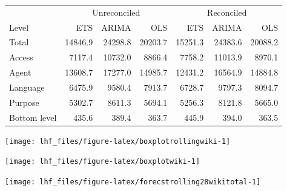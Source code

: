 \documentclass[11pt,a4paper,]{article}
\let\origfigure\figure
\let\endorigfigure\endfigure
\renewenvironment{figure}[1][2] {
    \expandafter\origfigure\expandafter[!htbp]
} {
    \endorigfigure
}
\let\origtable\table
\let\endorigtable\endtable
\renewenvironment{table}[1][2] {
    \expandafter\origtable\expandafter[!htbp]
} {
    \endorigtable
}
\providecommand{\DIFdeltex}[1]{{\protect\color{red}\sout{#1}}}                      %
\providecommand{\DIFdelFL}[1]{\DIFdel{#1}} %
\providecommand{\DIFdelbeginFL}{} %
\providecommand{\DIFdelendFL}{} %
\providecommand{\DIFdel}[1]{\texorpdfstring{\DIFdeltex{#1}}{}} %
\newcommand{\DIFscaledelfig}{0.5}
\newlength{\DIFdelgraphicswidth} %
\newlength{\DIFdelgraphicsheight} %
\newcommand{\DIFdelincludegraphics}[2][]{%
\sbox{\DIFdelgraphicsbox}{\DIFOincludegraphics[#1]{#2}}%
\settoboxwidth{\DIFdelgraphicswidth}{\DIFdelgraphicsbox} %
\settoboxtotalheight{\DIFdelgraphicsheight}{\DIFdelgraphicsbox} %
\scalebox{\DIFscaledelfig}{%
\parbox[b]{\DIFdelgraphicswidth}{\usebox{\DIFdelgraphicsbox}\\[-\baselineskip] \rule{\DIFdelgraphicswidth}{0em}}\llap{\resizebox{\DIFdelgraphicswidth}{\DIFdelgraphicsheight}{%
\setlength{\unitlength}{\DIFdelgraphicswidth}%
\begin{picture}(1,1)%
\thicklines\linethickness{2pt} %
{\color[rgb]{1,0,0}\put(0,0){\framebox(1,1){}}}%
{\color[rgb]{1,0,0}\put(0,0){\line( 1,1){1}}}%
{\color[rgb]{1,0,0}\put(0,1){\line(1,-1){1}}}%
\end{picture}%
}\hspace*{3pt}}} %
} %
\DeclareRobustCommand{\DIFdelbeginFL}{\DIFOdelbeginFL \let\includegraphics\DIFdelincludegraphics} %
\DeclareRobustCommand{\DIFdelendFL}{\DIFOaddendFL \let\includegraphics\DIFOincludegraphics} %
\begin{document}
\begin{table}

\caption{\label{tab:wikipediadataresultRMSE}Mean \DIFdelbeginFL \DIFdelFL{(}\DIFdelendFL RMSE \DIFdelbeginFL \DIFdelFL{) }\DIFdelendFL for ETS, ARIMA and OLS with and without reconciliation - Fixed origin - Wikipedia dataset}
\centering
\begin{tabular}[t]{lrrrrrr}
\toprule
\multicolumn{1}{c}{} & \multicolumn{3}{c}{Unreconciled} & \multicolumn{3}{c}{Reconciled} \\
\cmidrule(l{3pt}r{3pt}){2-4} \cmidrule(l{3pt}r{3pt}){5-7}
Level & ETS & ARIMA & OLS & ETS & ARIMA & OLS\\
\midrule
Total & 14846.9 & 24298.8 & 20203.7 & 15251.3 & 24383.6 & 20088.2\\
Access & 7117.4 & 10732.0 & 8866.4 & 7758.2 & 11013.9 & 8970.1\\
Agent & 13608.7 & 17277.0 & 14985.7 & 12431.2 & 16564.9 & 14884.8\\
Language & 6475.9 & 9580.4 & 7913.7 & 6728.7 & 9797.3 & 8094.7\\
Purpose & 5302.7 & 8611.3 & 5694.1 & 5256.3 & 8121.8 & 5665.0\\
Bottom level & 435.6 & 389.4 & 363.7 & 445.9 & 394.0 & 363.5\\
\bottomrule
\end{tabular}
\end{table}

\begin{figure}

{\centering \texttt{[image: lhf\_files/figure-latex/boxplotrollingwiki-1]}

}

\caption{Box plots of forecast errors for reconciled and unreconciled ETS, ARIMA and OLS methods at each hierarchical level for rolling origin forecasts of Wikipedia pageviews.}\label{fig:boxplotrollingwiki}
\end{figure}

\begin{figure}

{\centering \texttt{[image: lhf\_files/figure-latex/boxplotwiki-1]}

}

\caption{Box plots of forecast errors for reconciled and unreconciled ETS, ARIMA and OLS methods at each hierarchical level for fixed origin forecasts of Wikipedia pageviews.}\label{fig:boxplotwiki}
\end{figure}

\begin{figure}

{\centering \texttt{[image: lhf\_files/figure-latex/forecstrolling28wikitotal-1]}

}

\caption{The actual test set for the 'Total' series compared to the forecasts from reconciled and unreconciled ETS, ARIMA and OLS methods for rolling and fixed origin forecasts of Wikipedia pageviews.}\label{fig:forecstrolling28wikitotal}
\end{figure}
\end{document}
